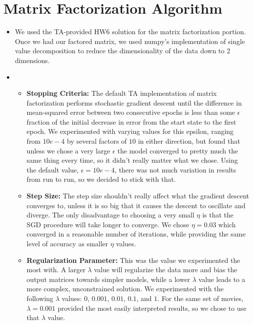 \section{Matrix Factorization Algorithm}
\medskip
\begin{itemize}

    \item {}
    We used the TA-provided HW6 solution for the matrix factorization portion. Once
    we had our factored matrix, we used numpy's implementation of single value decomposition
    to reduce the dimensionality of the data down to 2 dimensions. 
    
    \item {} \\

    \begin{itemize}
    \item \textbf{Stopping Criteria:} The default TA implementation of matrix factorization performs stochastic 
    gradient descent until the difference in mean-squared error between two 
    consecutive epochs is less than some $\epsilon$ fraction of the initial
    decrease in error from the start state to the first epoch. We experimented
    with varying values for this epsilon, ranging from $10e-4$ by several factors of
    $10$ in either direction, but found that unless we chose a very
    large $\epsilon$ the model converged to pretty much the same thing every time,
    so it didn't really matter what we chose. Using the default value, $\epsilon = 10e-4$,
    there was not much variation in results from run to run, so we decided to stick
    with that.

    \item \textbf{Step Size:} The step size shouldn't really affect what the
    gradient descent converges to, unless it is so big that it causes the descent
    to oscillate and diverge. The only disadvantage to choosing a very small 
    $\eta$ is that the SGD procedure will take longer to converge. We chose
    $\eta = 0.03$ which converged in a reasonable number of iterations, while
    providing the same level of accuracy as smaller $\eta$ values.

    \item \textbf{Regularization Parameter:} This was the value we experimented
    the most with. A larger $\lambda$ value will regularize the data more and bias
    the output matrices towards simpler models, while a lower $\lambda$ value leads
    to a more complex, unconstrained solution. We experimented with the following
    $\lambda$ values: $0$, $0.001$, $0.01$, $0.1$, and $1$. For the same set of
    movies, $\lambda = 0.001$ provided the most easily interpreted results, so
    we chose to use that $\lambda$ value.
    \end{itemize}


\end{itemize}
